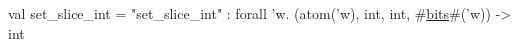 val set_slice_int = "set_slice_int" : forall 'w. (atom('w), int, int, #\hyperref[zbits]{bits}#('w)) -> int
